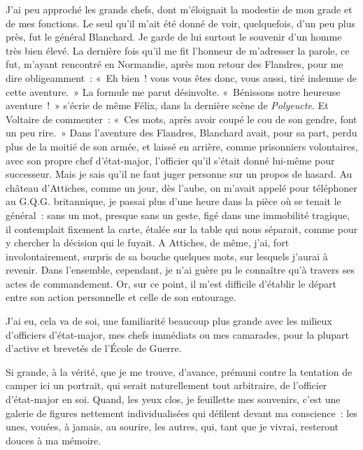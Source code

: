 \documentclass[french,twoside]{book} %
\begin{document}
J’ai peu approché les grands chefs, dont m’éloignait la modestie de mon grade et de mes fonctions. Le seul qu’il m’ait été donné de voir, quelquefois, d’un peu plus près, fut le général Blanchard. Je garde de lui surtout le souvenir d’un homme très bien élevé. La dernière fois qu’il me fit l’honneur de m’adresser la parole, ce fut, m’ayant rencontré en Normandie, après mon retour des Flandres, pour me dire obligeamment : « Eh bien ! vous vous êtes donc, vous aussi, tiré indemne de cette aventure. » La formule me parut désinvolte. « Bénissons notre heureuse aventure ! » s’écrie de même Félix, dans la dernière scène de \emph{Polyeucte.} Et Voltaire de commenter : « Ces mots, après avoir coupé le cou de son gendre, font un peu rire. » Dans l’aventure des Flandres, Blanchard avait, pour sa part, perdu plus de la moitié de son armée, et laissé en arrière, comme prisonniers volontaires, avec son propre chef d’état-major, l’officier qu’il s’était donné lui-même pour successeur. Mais je sais qu’il ne faut juger personne sur un propos de hasard. Au château d’Attiches, comme un jour, dès l’aube, on m’avait appelé pour téléphoner au G.Q.G. britannique, je passai plus d’une heure dans la pièce où se tenait le général : sans un mot, presque sans un geste, figé dans une immobilité tragique, il contemplait fixement la carte, étalée sur la table qui nous séparait, comme pour y   chercher la décision qui le fuyait. A Attiches, de même, j’ai, fort involontairement, surpris de sa bouche quelques mots, sur lesquels j’aurai à revenir. Dans l’ensemble, cependant, je n’ai guère pu le connaître qu’à travers ses actes de commandement. Or, sur ce point, il m’est difficile d’établir le départ entre son action personnelle et celle de son entourage.\par
J’ai eu, cela va de soi, une familiarité beaucoup plus grande avec les milieux d’officiers d’état-major, mes chefs immédiats ou mes camarades, pour la plupart d’active et brevetés de l’École de Guerre.\par
Si grande, à la vérité, que je me trouve, d’avance, prémuni contre la tentation de camper ici un portrait, qui serait naturellement tout arbitraire, de l’officier d’état-major en soi. Quand, les yeux clos, je feuillette mes souvenirs, c’est une galerie de figures nettement individualisées qui défilent devant ma conscience : les unes, vouées, à jamais, au sourire, les autres, qui, tant que je vivrai, resteront douces à ma mémoire.\par
\end{document}
